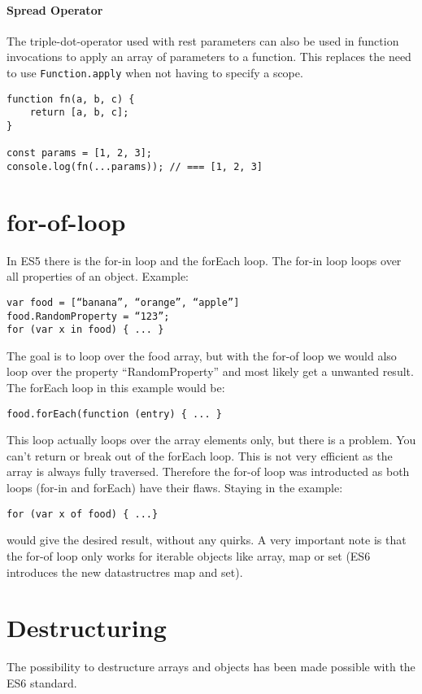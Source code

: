 \documentclass{bioinfo}
\begin{document}
\paragraph{Spread Operator}
The triple-dot-operator used with rest parameters can also be used in function invocations
to apply an array of parameters to a function. This replaces the need to use {\tt Function.apply}
when not having to specify a scope.

\begin{lstlisting}
function fn(a, b, c) {
    return [a, b, c];
}

const params = [1, 2, 3];
console.log(fn(...params)); // === [1, 2, 3]
\end{lstlisting}

\section{for-of-loop}
In ES5 there is the for-in loop and the forEach loop.
The for-in loop loops over all properties of an object. Example:
\begin{lstlisting}
var food = [“banana”, “orange”, “apple”]
food.RandomProperty = “123”;
for (var x in food) { ... }
\end{lstlisting}
The goal is to loop over the food array, but with the for-of loop we would also loop over the property
“RandomProperty” and most likely get a unwanted result.
The forEach loop in this example would be:
\begin{lstlisting}
food.forEach(function (entry) { ... }
\end{lstlisting}
This loop actually loops over the array elements only, but there is a problem. You can’t return or
break out of the forEach loop. This is not very efficient as the array is always fully traversed.
Therefore the for-of loop was introducted as both loops (for-in and forEach) have their flaws.
Staying in the example:
\begin{lstlisting}
for (var x of food) { ...}
\end{lstlisting}

 would give the desired result, without any quirks. A very important note is
that the for-of loop only works for iterable objects like array, map or set (ES6 introduces the new
datastructres map and set).

\section{Destructuring}
The possibility to destructure arrays and objects has been made possible with
the ES6 standard.
\end{document}
